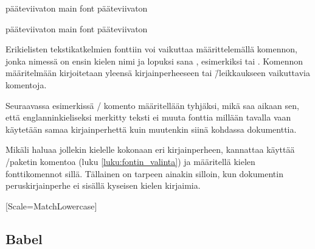 \begin{koodilohkosis}
\sffamily
pääteviivaton \textenglish{main font} pääteviivaton
\end{koodilohkosis}

\begin{tulossis}
  \sffamily pääteviivaton {\rmfamily main font} pääteviivaton
\end{tulossis}

Erikielisten tekstikatkelmien fonttiin voi vaikuttaa määrittelemällä
komennon, jonka nimessä on ensin kielen nimi ja lopuksi sana
, esimerkiksi  tai .
Komennon määritelmään kirjoitetaan yleensä kirjainperheeseen tai
\=/leikkaukseen vaikuttavia komentoja.

Seuraavassa esimerkissä \-/ komento määritellään
tyhjäksi, mikä saa aikaan sen, että englanninkieliseksi merkitty teksti
ei muuta fonttia millään tavalla vaan käytetään samaa kirjainperhettä
kuin muutenkin siinä kohdassa dokumenttia.

\begin{koodilohkosis}
\newcommand{\englishfont}{}
\end{koodilohkosis}

Mikäli haluaa jollekin kielelle kokonaan eri kirjainperheen, kannattaa
käyttää \-/paketin komentoa 
(luku \ref{luku:fontin_valinta}) ja määritellä kielen fonttikomennot
sillä. Tällainen on tarpeen ainakin silloin, kun dokumentin
peruskirjainperhe ei sisällä kyseisen kielen kirjaimia.

\begin{koodilohkosis}
[Scale=MatchLowercase]
\end{koodilohkosis}


%


\subsection{Babel}

